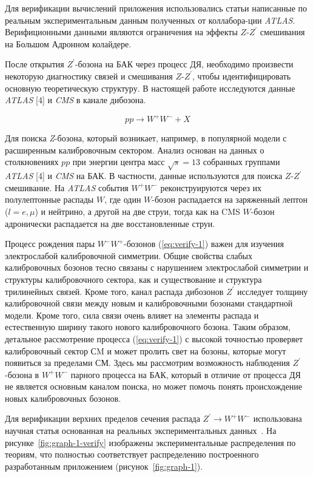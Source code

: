 Для верификации вычислений приложения использовались статьи написанные по реальным экспериментальным данным полученных от коллабора-ции \textit{ATLAS}. Верифиционными данными являются ограничения на эффекты $Z$-${Z}^{\prime}$ смешивания на Большом Адронном колайдере.

После открытия $Z^\prime$-бозона на БАК через процесс ДЯ, необходимо произвести некоторую диагностику связей и смешивания $Z$-$Z^\prime$, чтобы идентифицировать основную теоретическую структуру. В настоящей работе исследуются данные \textit{ATLAS} [4] и \textit{CMS} в канале дибозона.

\begin{equation} \label{eq:verify-1}
pp \rightarrow W^+W^- + X
\end{equation}

Для поиска \textit{Z}-бозона, который возникает, например, в популярной модели с расширенным калибровочным сектором. Анализ основан на данных о столкновениях $pp$ при энергии центра масс $\sqrt{s} = 13 $ собранных группами \textit{ATLAS} [4] и \textit{CMS} на БАК. В частности, данные используются для поиска $Z$-$Z^\prime$ смешивание. На \textit{ATLAS} события $W^+W^-$ реконструируются через их полулептонные распады $W$, где один $W$-бозон распадается на заряженный лептон ($l=e,\mu$) и нейтрино, а другой на две струи, тогда как на CMS $W$-бозон адронически распадается на две восстановленные струи. 

Процесс рождения пары $W^-W^+$-бозонов (\ref{eq:verify-1}) важен для изучения электрослабой калибровочной симметрии. Общие свойства слабых калибровочных бозонов тесно связаны с нарушением электрослабой симметрии и структуры калибровочного сектора, как и существование и структура трилинейных связей. Кроме того, канал распада дибозонов $Z^\prime$ исследует толщину калибровочной связи между новым и калибровочными бозонами стандартной модели. Кроме того, сила связи очень влияет на элементы распада и естественную ширину такого нового калибровочного бозона. Таким образом, детальное рассмотрение процесса (\ref{eq:verify-1}) с высокой точностью проверяет калибровочный сектор СM и может пролить свет на бозоны, которые могут появиться за пределами СМ. Здесь мы рассмотрим возможность наблюдения $Z^\prime$-бозона в $W^+W^-$ парного процесса на БАК, который в отличие от процесса ДЯ не является основным каналом поиска, но может помочь понять происхождение новых калибровочных бозонов.

Для верификации верхних пределов сечения распада ${Z}^{\prime} \rightarrow {W}^{+}{W}^{-} $ использована научная статья основанная на реальных экспериментальных данных~\cite{2part-pankov}. На рисунке~\ref{fig:graph-1-verify} изображены экспериментальные распределения по теориям, что полностью соответствует распределению построенного разработанным приложением (рисунок~\ref{fig:graph-1}).

